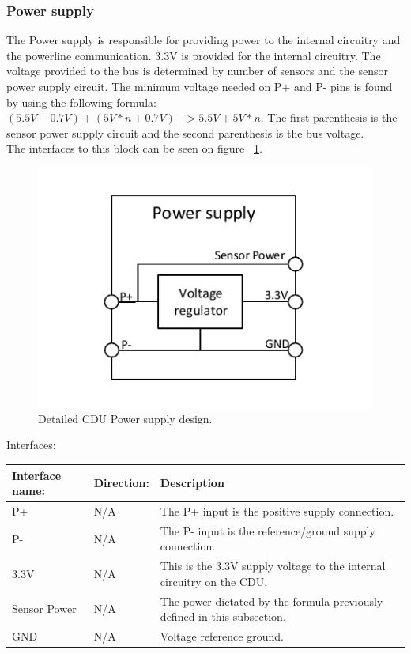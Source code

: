 \subsubsection{Power supply}
The Power supply is responsible for providing power to the internal circuitry and the powerline communication. 3.3V is provided for the internal circuitry. The voltage provided to the bus is determined by number of sensors and the sensor power supply circuit. The minimum voltage needed on P+ and P- pins is found by using the following formula: $( 5.5V - 0.7V ) + (5V * n + 0.7V) -> 5.5V + 5V * n$. The first parenthesis is the sensor power supply circuit and the second parenthesis is the bus voltage.\\
The interfaces to this block can be seen on figure ~\ref{fig:CDUPS}.\\
\begin{figure}[H]
	\centering
	\includegraphics[scale=1]{billeder/CDUPS}
	\caption{Detailed CDU Power supply design.}
	\label{fig:CDUPS}
\end{figure}
Interfaces:
\begin{table}[H]
	\centering
	\begin{tabular}{|p{3cm} |p{3cm}| p{8cm}| }
		\hline
		Interface name: &Direction:	& Description \\ \hline
		P+ 				&N/A & The P+ input is the positive supply connection. \\ \hline
		P- 				&N/A & The P- input is the reference/ground supply connection. \\ \hline
		3.3V			&N/A & This is the 3.3V supply voltage to the internal circuitry on the CDU. \\ 	\hline
		Sensor Power	&N/A & The power dictated by the formula previously defined in this subsection. \\ \hline
		GND				&N/A & Voltage reference ground. \\\hline 
	\end{tabular}
\end{table}

